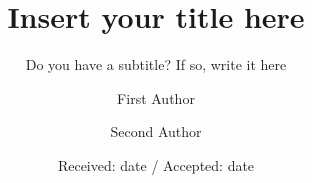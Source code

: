 \documentclass[twocolumn,epjc3]{svjour3}
\title{Insert your title here\thanksref{t1}}
\subtitle{Do you have a subtitle? If so, write it here}
\institute{First address \label{addr1} \and Second address \label{addr2} \and \emph{Present Address:} if needed\label{addr3}}
\date{Received: date / Accepted: date}
\begin{document}
\author{First Author \and Second Author}

\maketitle

\begin{abstract}
\blindtext
\end{abstract}

\blinddocument
\end{document}
